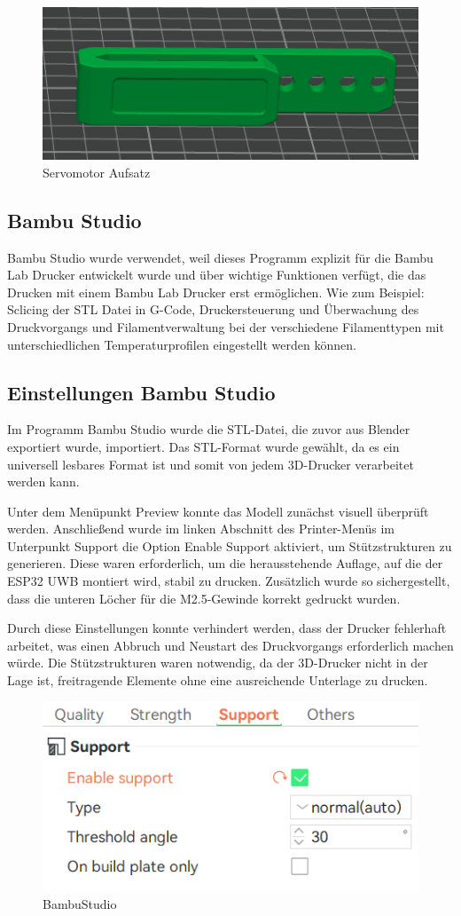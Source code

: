 \begin{figure}[H]
	\centering
	\includegraphics[width=0.5\linewidth]{images/Clip.png}
	\caption[Servomotor Aufsatz]{Servomotor Aufsatz}
	\label{fig:ESP32-Aufsatz}
	\label{Servomotor Aufsatz}
\end{figure}

\subsection{Bambu Studio}
Bambu Studio wurde verwendet, weil dieses Programm explizit für die Bambu Lab Drucker entwickelt wurde und über wichtige Funktionen verfügt, die das Drucken mit einem Bambu Lab Drucker erst ermöglichen. Wie zum Beispiel: Sclicing der STL Datei in G-Code, Druckersteuerung und Überwachung des Druckvorgangs und Filamentverwaltung bei der verschiedene Filamenttypen mit unterschiedlichen Temperaturprofilen eingestellt werden können.

\newpage
\subsection{Einstellungen Bambu Studio}
Im Programm Bambu Studio wurde die STL-Datei, die zuvor aus Blender exportiert wurde, importiert. Das STL-Format wurde gewählt, da es ein universell lesbares Format ist und somit von jedem 3D-Drucker verarbeitet werden kann.  

Unter dem Menüpunkt Preview konnte das Modell zunächst visuell überprüft werden. Anschließend wurde im linken Abschnitt des Printer-Menüs im Unterpunkt Support die Option Enable Support aktiviert, um Stützstrukturen zu generieren. Diese waren erforderlich, um die herausstehende Auflage, auf die der ESP32 UWB montiert wird, stabil zu drucken. Zusätzlich wurde so sichergestellt, dass die unteren Löcher für die M2.5-Gewinde korrekt gedruckt wurden.  

Durch diese Einstellungen konnte verhindert werden, dass der Drucker fehlerhaft arbeitet, was einen Abbruch und Neustart des Druckvorgangs erforderlich machen würde. Die Stützstrukturen waren notwendig, da der 3D-Drucker nicht in der Lage ist, freitragende Elemente ohne eine ausreichende Unterlage zu drucken.
\begin{figure}[H]
	\centering
	\includegraphics[width=0.5\linewidth]{images/BambuStudio.jpg}
	\caption[BambuStudio]{BambuStudio}
	\label{fig:BambuStudio} 
\end{figure}

